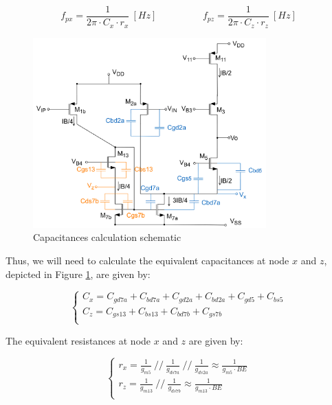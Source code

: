 $$f_{px} = \frac{1}{2\pi \cdot C_x\cdot r_x} \ [Hz]  \hspace{2cm}  f_{pz} = \frac{1}{2\pi \cdot C_z\cdot r_z} \ [Hz]$$

\begin{figure}[H]
    \centering
    \includegraphics[width=0.8\textwidth]{Images/Cx_Cz.png}
    \caption{Capacitances calculation schematic}
    \label{fig:poles_sch}
\end{figure}

Thus, we will need to calculate the equivalent capacitances at node $x$ and $z$, depicted in Figure \ref{fig:poles_sch}, are given by:

\begin{equation}
    \begin{cases}
        C_x = C_{gd7a} + C_{bd7a}+ C_{gd2a} + C_{bd2a} + C_{gd5} + C_{bs5}\\
        C_z = C_{gs13} + C_{bs13} + C_{bd7b}+ C_{gs7b} \\
    \end{cases}
\end{equation}

The equivalent resistances at node $x$ and $z$ are given by:

\begin{equation}
    \begin{cases}
        r_x = \frac{1}{g_{m5}} \ // \ \frac{1}{g_{ds7a}} \ // \ \frac{1}{g_{ds2a}}\approx \frac{1}{g_{m5} \cdot BE}\\
        r_z = \frac{1}{g_{m13}} \ // \ \frac{1}{g_{ds7b}} \approx \frac{1}{g_{m13} \cdot BE} \\
    \end{cases}
\end{equation}

